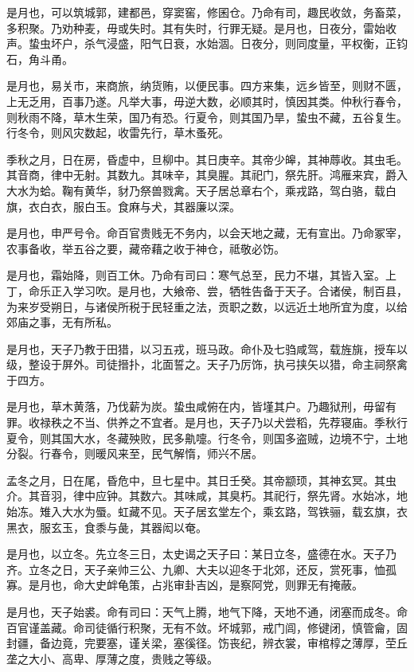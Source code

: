 \documentclass[]{article}
\begin{document}
是月也，可以筑城郭，建都邑，穿窦窖，修囷仓。乃命有司，趣民收敛，务畜菜，多积聚。乃劝种麦，毋或失时。其有失时，行罪无疑。是月也，日夜分，雷始收声。蛰虫坏户，杀气浸盛，阳气日衰，水始涸。日夜分，则同度量，平权衡，正钧石，角斗甬。

是月也，易关市，来商旅，纳货贿，以便民事。四方来集，远乡皆至，则财不匮，上无乏用，百事乃遂。凡举大事，毋逆大数，必顺其时，慎因其类。仲秋行春令，则秋雨不降，草木生荣，国乃有恐。行夏令，则其国乃旱，蛰虫不藏，五谷复生。行冬令，则风灾数起，收雷先行，草木蚤死。

季秋之月，日在房，昏虚中，旦柳中。其日庚辛。其帝少皞，其神蓐收。其虫毛。其音商，律中无射。其数九。其味辛，其臭腥。其祀门，祭先肝。鸿雁来宾，爵入大水为蛤。鞠有黄华，豺乃祭兽戮禽。天子居总章右个，乘戎路，驾白骆，载白旗，衣白衣，服白玉。食麻与犬，其器廉以深。

是月也，申严号令。命百官贵贱无不务内，以会天地之藏，无有宣出。乃命冢宰，农事备收，举五谷之要，藏帝藉之收于神仓，祗敬必饬。

是月也，霜始降，则百工休。乃命有司曰：寒气总至，民力不堪，其皆入室。上丁，命乐正入学习吹。是月也，大飨帝、尝，牺牲告备于天子。合诸侯，制百县，为来岁受朔日，与诸侯所税于民轻重之法，贡职之数，以远近土地所宜为度，以给郊庙之事，无有所私。

是月也，天子乃教于田猎，以习五戎，班马政。命仆及七驺咸驾，载旌旐，授车以级，整设于屏外。司徒搢扑，北面誓之。天子乃厉饰，执弓挟矢以猎，命主祠祭禽于四方。

是月也，草木黄落，乃伐薪为炭。蛰虫咸俯在内，皆墐其户。乃趣狱刑，毋留有罪。收禄秩之不当、供养之不宜者。是月也，天子乃以犬尝稻，先荐寝庙。季秋行夏令，则其国大水，冬藏殃败，民多鼽嚏。行冬令，则国多盗贼，边境不宁，土地分裂。行春令，则暖风来至，民气解惰，师兴不居。

孟冬之月，日在尾，昏危中，旦七星中。其日壬癸。其帝颛顼，其神玄冥。其虫介。其音羽，律中应钟。其数六。其味咸，其臭朽。其祀行，祭先肾。水始冰，地始冻。雉入大水为蜃。虹藏不见。天子居玄堂左个，乘玄路，驾铁骊，载玄旗，衣黑衣，服玄玉，食黍与彘，其器闳以奄。

是月也，以立冬。先立冬三日，太史谒之天子曰：某日立冬，盛德在水。天子乃齐。立冬之日，天子亲帅三公、九卿、大夫以迎冬于北郊，还反，赏死事，恤孤寡。是月也，命大史衅龟策，占兆审卦吉凶，是察阿党，则罪无有掩蔽。

是月也，天子始裘。命有司曰：天气上腾，地气下降，天地不通，闭塞而成冬。命百官谨盖藏。命司徒循行积聚，无有不敛。坏城郭，戒门闾，修键闭，慎管龠，固封疆，备边竟，完要塞，谨关梁，塞徯径。饬丧纪，辨衣裳，审棺椁之薄厚，茔丘垄之大小、高卑、厚薄之度，贵贱之等级。
\end{document}
